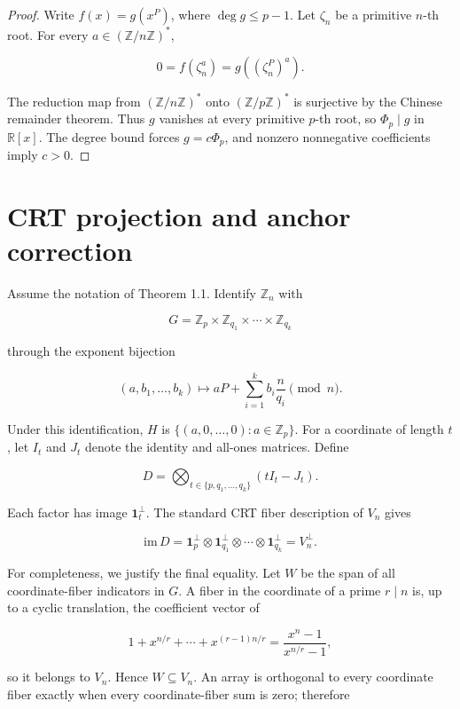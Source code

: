 \documentclass[11pt]{article}
\numberwithin{equation}{section}
\begin{document}
\begin{proof}

Write \(f(x)=g(x^P)\), where \(\deg g\leq p-1\). Let \(\zeta_n\) be a
primitive \(n\)-th root. For every \(a\in(\mathbb Z/n\mathbb Z)^*\),

\nopagebreak[4]
\[
0=f(\zeta_n^a)=g((\zeta_n^P)^a).
\]

The reduction map from \((\mathbb Z/n\mathbb Z)^*\) onto
\((\mathbb Z/p\mathbb Z)^*\) is surjective by the Chinese remainder theorem.
Thus \(g\) vanishes at every primitive \(p\)-th root, so
\(\Phi_p\mid g\) in \(\mathbb R[x]\). The degree bound forces
\(g=c\Phi_p\), and nonzero nonnegative coefficients imply \(c>0\).
\end{proof}


\section{CRT projection and anchor correction}


Assume the notation of Theorem 1.1. Identify \(\mathbb Z_n\) with

\nopagebreak[4]
\[
G=\mathbb Z_p\times
\mathbb Z_{q_1}\times\cdots\times\mathbb Z_{q_k}
\tag{3.1}
\]

through the exponent bijection

\nopagebreak[4]
\[
(a,b_1,\ldots,b_k)
\longmapsto
aP+\sum_{i=1}^k b_i\frac n{q_i}\pmod n.
\tag{3.2}
\]

Under this identification, \(H\) is
\(\{(a,0,\ldots,0):a\in\mathbb Z_p\}\).
For a coordinate of length \(t\), let \(I_t\) and \(J_t\) denote the identity
and all-ones matrices. Define

\nopagebreak[4]
\[
D=\bigotimes_{t\in\{p,q_1,\ldots,q_k\}}(tI_t-J_t).
\tag{3.3}
\]

Each factor has image \(\mathbf1_t^\perp\). The standard CRT fiber
description of \(V_n\) gives

\nopagebreak[4]
\[
\mathrm{im}\,D=
\mathbf1_p^\perp\otimes
\mathbf1_{q_1}^\perp\otimes\cdots\otimes
\mathbf1_{q_k}^\perp
=V_n^\perp.
\tag{3.4}
\]

For completeness, we justify the final equality. Let \(W\) be the span of
all coordinate-fiber indicators in \(G\). A fiber in the coordinate of a
prime \(r\mid n\) is, up to a cyclic translation, the coefficient vector of

\nopagebreak[4]
\[
1+x^{n/r}+\cdots+x^{(r-1)n/r}
=\frac{x^n-1}{x^{n/r}-1},
\]

so it belongs to \(V_n\). Hence \(W\subseteq V_n\). An array is orthogonal
to every coordinate fiber exactly when every coordinate-fiber sum is zero;
therefore
\end{document}
